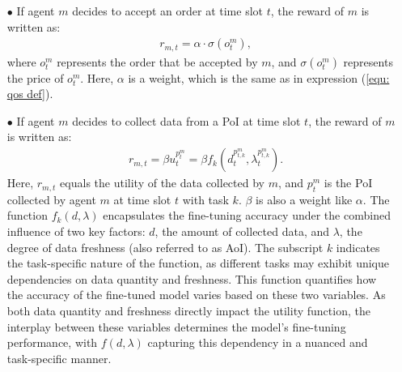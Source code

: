 \begin{itemize}
\item[$\bullet$] If agent $m$ decides to accept an order at time slot $t$, the reward of $m$ is written as: 
\begin{align}
& r_{m,t} = \alpha \cdot \sigma(o_t^m),
\end{align}
where $o_t^m$ represents the order that be accepted by $m$, and $\sigma(o_t^m)$ represents the price of $o_t^m$. Here, $\alpha$ is a weight, which is the same as in expression (\ref{equ: qos def}).
\end{itemize}

\begin{itemize}
\item[$\bullet$] 
If agent $m$ decides to collect data from a PoI at time slot $t$, the reward of $m$ is written as: 
\begin{align}
& r_{m,t} = \beta u_t^{p_t^m} = \beta f_k(d_t^{p_{t,k}^m},{\lambda}_t^{{p_{t,k}^m}}).
\end{align}
Here, $r_{m,t}$ equals the utility of the data collected by $m$, and $p_t^m$ is the PoI collected by agent $m$ at time slot $t$ with task $k$. $\beta$ is also a weight like $\alpha$. The function \( f_k(d, \lambda) \) encapsulates the fine-tuning accuracy under the combined influence of two key factors: \( d \), the amount of collected data, and \( \lambda \), the degree of data freshness (also referred to as AoI). The subscript \( k \) indicates the task-specific nature of the function, as different tasks may exhibit unique dependencies on data quantity and freshness. This function quantifies how the accuracy of the fine-tuned model varies based on these two variables. As both data quantity and freshness directly impact the utility function, the interplay between these variables determines the model’s fine-tuning performance, with \( f(d, \lambda) \) capturing this dependency in a nuanced and task-specific manner.
\end{itemize}


